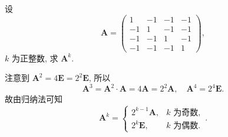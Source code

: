 \documentclass[../../main.tex]{subfiles}
\begin{document}
\begin{example}
设
\[
\boldsymbol{A} = \begin{pmatrix} 1 & -1 & -1 & -1 \\ -1 & 1 & -1 & -1 \\ -1 & -1 & 1 & -1 \\ -1 & -1 & -1 & 1 \end{pmatrix},
\]
\(k\) 为正整数, 求 \(\boldsymbol{A}^k\).
\end{example}
\begin{solution}
注意到 \(\boldsymbol{A}^2 = 4\boldsymbol{E} = 2^2\boldsymbol{E}\), 所以
\[
\boldsymbol{A}^3 = \boldsymbol{A}^2 \cdot \boldsymbol{A} = 4\boldsymbol{A} = 2^2\boldsymbol{A}, \quad \boldsymbol{A}^4 = 2^4\boldsymbol{E}.
\]
故由归纳法可知
\[
\boldsymbol{A}^k = \begin{cases} 2^{k - 1}\boldsymbol{A}, & k \text{ 为奇数}, \\ 2^k\boldsymbol{E}, & k \text{ 为偶数}. \end{cases}.
\]
\end{solution}
\end{document}
